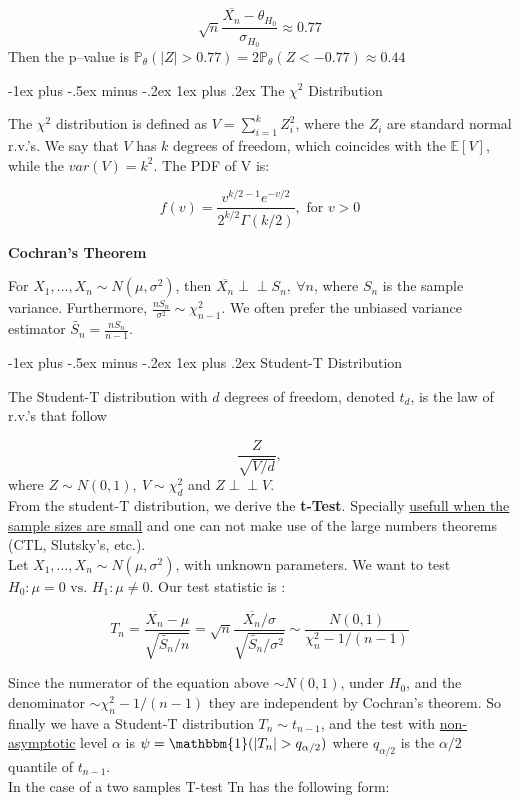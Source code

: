 \documentclass[landscape]{article}
\makeatletter
\renewcommand{\subsubsection}{\@startsection{subsubsection}{3}{0mm}%
                                {-1ex plus -.5ex minus -.2ex}%
                                {1ex plus .2ex}%
                                {\normalfont\small\bfseries}}
\makeatother
\begin{document}
\begin{multicols}{3}
$$\sqrt{n} \frac{\overline{X_n} - \theta_{H_0}}{\sigma_{H_0}} \approx 0.77$$
Then the p--value is $\mathbb{P}_\theta (|Z| > 0.77) = 2 \mathbb{P}_\theta(Z < - 0.77) \approx 0.44$

\subsubsection{The \texorpdfstring{$\chi^2$}{TEXT} Distribution}

The $\chi^2$ distribution is defined as $V = \sum_{i = 1}^{k} Z^{2}_{i}$, where the $Z_i$ are standard normal r.v.'s.
We say that $V$ has $k$ degrees of freedom, which coincides with the $\mathbb{E}[V]$, while the $var(V) = k^2$. The PDF of V is:

$$f(v) = \frac{v^{k/2 - 1} e^{-v/2}}{2^{k/2} \Gamma(k/2)}, \text{ for } v > 0$$

\textbf{Cochran's Theorem}

For $X_1,\dots, X_n \sim  N(\mu, \sigma^2)$, then $\overline{X_n} {\perp \!\!\! \perp} S_n, \: \forall n$, where $S_n$ is the sample variance. 
Furthermore, $\frac{n S_n}{\sigma^2} \sim \chi^{2}_{n-1}$. We often prefer the unbiased variance estimator $\tilde{S_n} = \frac{n S_n}{n-1}$.

\subsubsection{Student-T Distribution}

The Student-T distribution with $d$ degrees of freedom, denoted $t_d$, is the law of r.v.'s that follow 

$$\frac{Z}{\sqrt{V/d}},$$ where $Z \sim N(0, 1), \: V \sim \chi^{2}_{d}$ and $Z {\perp \!\!\! \perp} V$.\\

From the student-T distribution, we derive the \textbf{t-Test}. Specially \underline{usefull when the sample sizes are small} and one can not make use of the 
large numbers theorems (CTL, Slutsky's, etc.).\\

Let $X_1,\dots, X_n \sim  N(\mu, \sigma^2)$, with unknown parameters. We want to test $H_0: \mu = 0 \text{ vs. } H_1: \mu \ne 0$. Our test statistic is :

$$T_n = \frac{\overline{X_n} - \mu}{\sqrt{\tilde{S_n}/n}} = \sqrt{n} \frac{\overline{X_n}/\sigma}{\sqrt{\tilde{S_n}/\sigma^2}} \sim \frac{N(0, 1)}{\chi^{2}_n-1 / (n-1)}$$

Since the numerator of the equation above $\sim N(0, 1)$, under $H_0$, and the denominator $\sim \chi^{2}_n-1 / (n-1)$ they are independent by Cochran's theorem.
So finally we have a Student-T distribution $T_n \sim t_{n-1}$, and the test with \underline{non-asymptotic} level $\alpha$ is 
$\psi = \mathbbm{1}(|T_n| > q_{\alpha/2})$ where $q_{\alpha/2}$ is the $\alpha/2$ quantile of $t_{n-1}$.\\
In the case of a two samples T-test Tn has the following form: 


\end{multicols}
\end{document}
